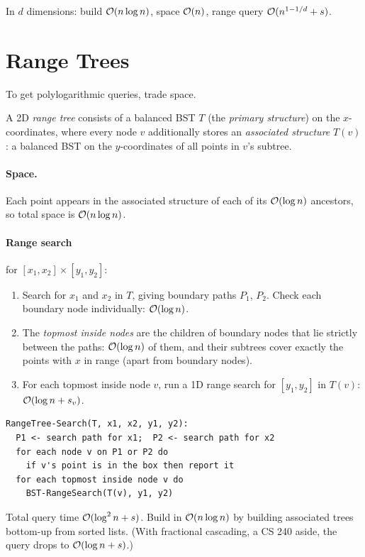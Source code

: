 In $d$ dimensions: build $\mathcal{O}(n \log n)$, space $\mathcal{O}(n)$, range query
$\mathcal{O}(n^{1 - 1/d} + s)$.

\section{Range Trees}

To get polylogarithmic queries, trade space.

\begin{definition}
A 2D \emph{range tree} consists of a balanced BST $T$ (the \emph{primary
structure}) on the $x$-coordinates, where every node $v$ additionally stores an
\emph{associated structure} $T(v)$: a balanced BST on the $y$-coordinates of all
points in $v$'s subtree.
\end{definition}

\paragraph{Space.} Each point appears in the associated structure of each of its
$\mathcal{O}(\log n)$ ancestors, so total space is $\mathcal{O}(n \log n)$.

\paragraph{Range search} for $[x_1, x_2] \times [y_1, y_2]$:
\begin{enumerate}
  \item Search for $x_1$ and $x_2$ in $T$, giving boundary paths $P_1$, $P_2$.
        Check each boundary node individually: $\mathcal{O}(\log n)$.
  \item The \emph{topmost inside nodes} are the children of boundary nodes that
        lie strictly between the paths: $\mathcal{O}(\log n)$ of them, and their
        subtrees cover exactly the points with $x$ in range (apart from boundary
        nodes).
  \item For each topmost inside node $v$, run a 1D range search for
        $[y_1, y_2]$ in $T(v)$: $\mathcal{O}(\log n + s_v)$.
\end{enumerate}
\begin{lstlisting}
RangeTree-Search(T, x1, x2, y1, y2):
  P1 <- search path for x1;  P2 <- search path for x2
  for each node v on P1 or P2 do
    if v's point is in the box then report it
  for each topmost inside node v do
    BST-RangeSearch(T(v), y1, y2)
\end{lstlisting}
Total query time $\mathcal{O}(\log^2 n + s)$. Build in $\mathcal{O}(n \log n)$ by building
associated trees bottom-up from sorted lists. (With fractional cascading, a
CS 240 aside, the query drops to $\mathcal{O}(\log n + s)$.)

